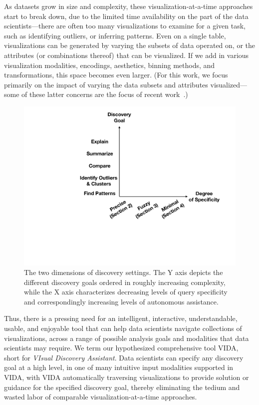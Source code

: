 \documentclass[11pt]{article}
\newcommand{\vida}{\textsc{VIDA}\xspace}
\begin{document}
\par
As datasets grow in size and complexity, 
these visualization-at-a-time approaches start to break down,
due to the limited time availability on the 
part of the data scientists---there 
are often too many visualizations to examine for a given 
task, such as identifying outliers, or inferring patterns. 
Even on a single table, 
visualizations can be generated
by varying the subsets of data operated on, 
or the attributes (or combinations
thereof) that can be visualized. 
If we add in various visualization modalities, encodings,
aesthetics, binning methods, and transformations,
this space becomes even larger. 
(For this work, we focus primarily on
the impact of varying the data subsets
and attributes visualized---some of these
latter concerns are the focus of recent work~\cite{Wongsuphasawat2017}.)

\begin{figure}
\centering
\vspace{-10pt}
\includegraphics[width=\linewidth]{figs/dimensions.pdf}
\vspace{-15pt}
\caption{The two dimensions of discovery settings. The Y axis depicts the different discovery goals ordered in roughly increasing complexity, while the X axis characterizes decreasing levels of query specificity and correspondingly increasing levels of autonomous assistance.}\label{fig:dimensions}
\vspace{-15pt}
\end{figure}


\par Thus, there is a pressing need for an 
intelligent,
interactive, understandable, usable, and
enjoyable tool that can help 
data scientists navigate
collections of visualizations, across a range of possible analysis goals and modalities that data scientists may require.
We term our hypothesized comprehensive tool \vida,
short for {\em VIsual Discovery Assistant}.
Data scientists can specify any discovery
goal at a high level, in one of many intuitive input modalities supported in \vida, with \vida automatically traversing visualizations to provide solution or guidance for the
specified discovery goal, thereby
eliminating the tedium and wasted
labor of comparable visualization-at-a-time 
approaches.
\end{document}
